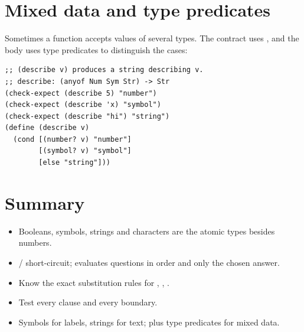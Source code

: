 \section{Mixed data and type predicates}
Sometimes a function accepts values of several types. The contract uses
, and the body uses type predicates to distinguish the cases:

\begin{lstlisting}[style=racket]
;; (describe v) produces a string describing v.
;; describe: (anyof Num Sym Str) -> Str
(check-expect (describe 5) "number")
(check-expect (describe 'x) "symbol")
(check-expect (describe "hi") "string")
(define (describe v)
  (cond [(number? v) "number"]
        [(symbol? v) "symbol"]
        [else "string"]))
\end{lstlisting}

\section{Summary}
\begin{itemize}
  \item Booleans, symbols, strings and characters are the atomic types besides numbers.
  \item {}/ short-circuit;  evaluates questions in order and only the chosen answer.
  \item Know the exact substitution rules for , , .
  \item Test every clause and every boundary.
  \item Symbols for labels, strings for text;  plus type predicates for mixed data.
\end{itemize}
